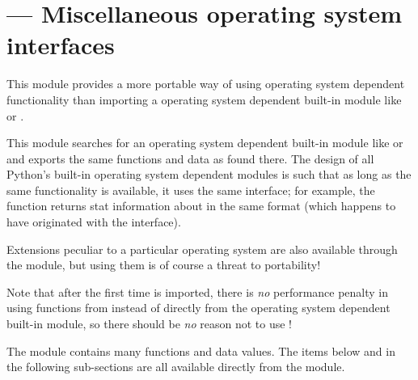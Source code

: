 \section{ ---
         Miscellaneous operating system interfaces}



This module provides a more portable way of using operating system
dependent functionality than importing a operating system dependent
built-in module like  or .

This module searches for an operating system dependent built-in module like
 or  and exports the same functions and data
as found there.  The design of all Python's built-in operating system dependent
modules is such that as long as the same functionality is available,
it uses the same interface; for example, the function
 returns stat information about  in
the same format (which happens to have originated with the
\POSIX{} interface).

Extensions peculiar to a particular operating system are also
available through the  module, but using them is of course a
threat to portability!

Note that after the first time  is imported, there is
\emph{no} performance penalty in using functions from 
instead of directly from the operating system dependent built-in module,
so there should be \emph{no} reason not to use !


%
\ifhtml
The  module contains many functions and data values.
The items below and in the following sub-sections are all available
directly from the  module.
\fi


